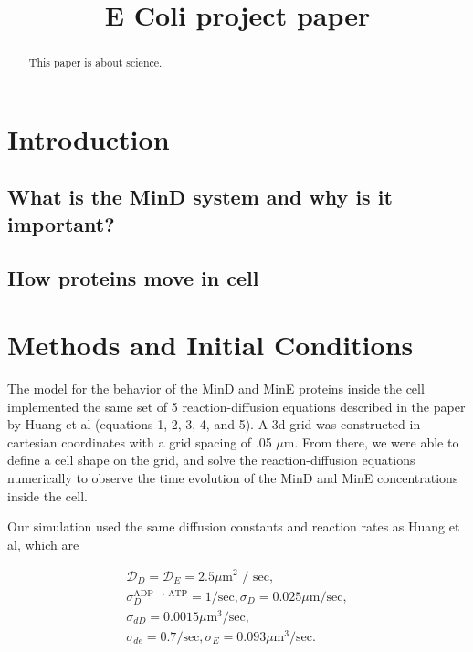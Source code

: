 \documentclass[letterpaper,twocolumn,amsmath,amssymb,pre]{revtex4-1}
\begin{document}
\title{E Coli project paper}

\begin{abstract}
  This paper is about science.
\end{abstract}
\section{Introduction}
\subsection{What is the MinD system and why is it important?}
\subsection{How proteins move in cell}
\section{Methods and Initial Conditions}
The model for the behavior of the MinD and MinE proteins inside the cell
implemented the same set of 5 reaction-diffusion equations described in the paper
by Huang et al (equations 1, 2, 3, 4, and 5). A 3d grid was constructed in
cartesian coordinates with a grid spacing of .05 $\mu$m. From there, we
were able to define a cell shape on the grid, and solve the
reaction-diffusion equations numerically to observe the time evolution of
the MinD and MinE concentrations inside the cell.

Our simulation used the same diffusion constants and reaction rates as
Huang et al, which are

\begin{gather*} %
  \mathcal{D}_D = \mathcal{D}_{E}  = 2.5 \mu \textrm{m$^2$ / sec}, \\
  \sigma_D^{\textrm{ADP $\rightarrow$ ATP}}  = 1/\textrm{sec},  \sigma_D = 0.025 \mu \textrm{m/sec}, \\
  \sigma_{dD}  = 0.0015 \mu \textrm{m$^3$/sec}, \\
  \sigma_{de}  = 0.7/\textrm{sec}, \sigma_E = 0.093 \mu \textrm{m$^3$/sec}.
\end{gather*}
\end{document}
